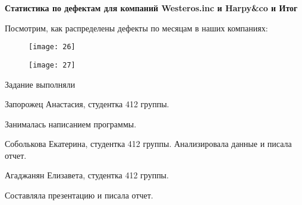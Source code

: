 \documentclass{beamer}
\begin{document}
\begin{frame}
\textbf{Статистика по дефектам для компаний Westeros.inc и Harpy\&co и Итог}

Посмотрим, как распределены дефекты по месяцам в наших компаниях:
\begin{figure}[t]
	\centering
	\texttt{[image: 26]}
	\label{fig:}
\end{figure}
\end{frame}

\begin{frame}
\begin{figure}[t]
	\centering
	\texttt{[image: 27]}
\end{figure}
\end{frame}

\begin{frame}



\end{frame}
\begin{frame}{Задание выполняли} 
\begin{itemize} 
	{ \item Запорожец Анастасия, студентка 412 группы. 
		
		Занималась написанием программы.
		\item Соболькова Екатерина, студентка 412 группы. Анализировала данные и писала отчет.
		\item Агаджанян Елизавета, студентка 412 группы. 
		
		Составляла презентацию и писала отчет. 
	} 
\end{itemize}
\end{frame}
\end{document}
